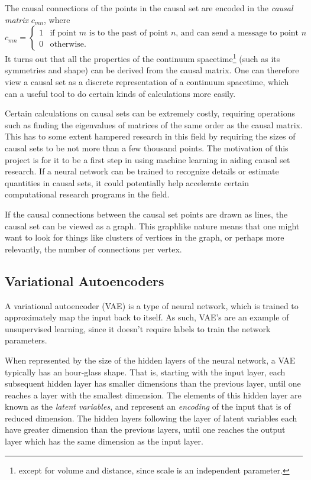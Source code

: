 \documentclass[letterpaper,10pt]{article}
\begin{document}
The causal connections of the points in the causal set are encoded in the {\it causal matrix} $c_{mn}$, where
\begin{equation}
 c_{mn} = \begin{cases}
      1 & \text{if point $m$ is to the past of point $n$, and can send a message to point $n$}\\
      0 & \text{otherwise.}
    \end{cases} 
\end{equation}
It turns out that all the properties of the continuum spacetime\footnote{except for volume and distance, since scale is an independent 
parameter.} (such as its symmetries and shape) can be derived from the causal matrix.  One can therefore view a causal set as a discrete representation 
of a continuum spacetime, which can a useful tool to do certain kinds of calculations more easily.

Certain calculations on causal sets can be extremely costly, requiring operations such as finding the eigenvalues of matrices of the same order as the 
causal matrix.  This has to some extent hampered research in this field by requiring the sizes of causal sets to be not more than a few thousand points.  
The motivation of this project is for it to be a first step in using machine learning in aiding causal set research.  If a neural network can be trained
to recognize details or estimate quantities in causal sets, it could potentially help accelerate certain computational research programs in the field.

If the causal connections between the causal set points are drawn as lines, the causal set can be viewed as a graph.  This graphlike nature means that 
one might want to look for things like clusters of vertices in the graph, or perhaps more relevantly, the number of connections per vertex.

\subsection{Variational Autoencoders} \label{vaesection}

A variational autoencoder \cite{vae} (VAE) is a type of neural network, which is trained to approximately map the input back to itself.  As such, 
VAE's are an example of unsupervised learning, since it doesn't require labels to train the network parameters.

When represented by the size of the hidden layers of the neural network, a VAE typically has an hour-glass shape.  That is, starting with the input layer, 
each subsequent hidden layer has smaller dimensions than the previous layer, until one reaches a layer with the smallest dimension.  
The elements of this hidden layer are known as the {\it latent variables}, and represent an {\it encoding} of the input that is of reduced dimension.  
The hidden layers following the layer of latent variables each have greater dimension than the previous layers, until one reaches the output layer which 
has the same dimension as the input layer.
\end{document}
